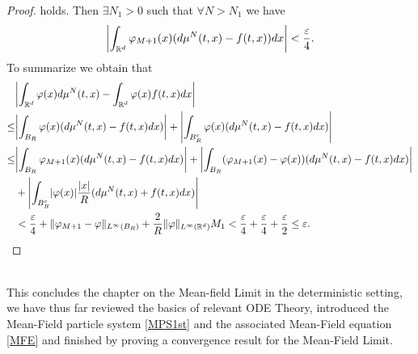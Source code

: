 \begin{proof}
  holds. Then $\exists N_{1}>0$ such that $\forall  N > N_{1}$ we have 
  \begin{align*}
    \abs*{\int_{\mathbb{R}^{d} }\phi_{M+1}(x)(d\mu ^{N}(t,x) - f(t,x) )dx}< \frac{\epsilon}{4}
  .\end{align*}
  To summarize we obtain that 
  \begin{alignat*}{1}
    &\abs*{\int_{\mathbb{R}^{d} }\phi(x) d\mu ^{N}(t,x) - \int_{\mathbb{R}^{d} }\phi(x) f(t,x) dx}\\
    \leq & \abs*{\int_{B_R }\phi(x)(d\mu ^{N}(t,x) - f(t,x)dx ) } 
    +\abs*{\int_{B_R^{c} } \phi(x)(d\mu ^{N}(t,x)-f(t,x)dx )}\\
   \leq  & \abs*{\int_{B_R }\phi_{M+1}(x)(d\mu ^{N}(t,x) - f(t,x)dx ) }  + \abs*{\int_{B_R} (\phi_{M+1}(x)-\phi(x))(d\mu ^{N}(t,x)-f(t,x)dx )}\\
    & + \abs*{\int_{B^{c}_R }\abs{\phi(x)} \frac{\abs{x}}{R}(d\mu ^{N}(t,x) + f(t,x) dx)}\\
    & < \frac{\epsilon}{4} + \|\phi_{M+1}-\phi \|_{L^{\infty}(B_R) } + \frac{2}{R}\|\phi \|_{L^{\infty}(\mathbb{R}^{d} ) }M_1 < \frac{\epsilon}{4} +\frac{\epsilon}{4} +\frac{\epsilon}{2} \le \epsilon
  .\end{alignat*}
\end{proof}
\hspace{0mm}\\[3ex]
This concludes the chapter on the Mean-field Limit in the deterministic setting, we have thus far 
reviewed the basics of relevant ODE Theory, introduced the Mean-Field particle system \autoref{MPS1st} and the 
associated Mean-Field equation \autoref{MFE} and finished by proving a convergence
result for the Mean-Field Limit.

